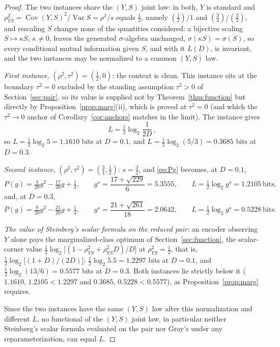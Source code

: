 ﻿\documentclass[11pt,onecolumn]{IEEEtran}
\newcommand{\Cov}{\operatorname{Cov}}
\begin{document}
\begin{proof}
The two instances share the $(Y,S)$ joint law: in both, $Y$ is standard
and
$\rho_{YS}^2=\Cov(Y,S)^2/\operatorname{Var}S=\rho^2/s$ equals
$\tfrac12$, namely $(\tfrac12)/1$ and $(\tfrac34)/(\tfrac32)$, and
rescaling $S$ changes none of the quantities considered: a bijective
scaling $S\mapsto\kappa S$, $\kappa\ne0$, leaves the generated
$\sigma$-algebra unchanged, $\sigma(\kappa S)=\sigma(S)$, so every
conditional mutual information given $S$, and with it $L(D)$, is
invariant, and the two instances may be normalized to a common
$(Y,S)$ law.

\emph{First instance,} $(\rho^2,\tau^2)=(\tfrac12,0)$: the context is
clean. This instance sits at the boundary $\tau^2=0$ excluded by the
standing assumption $\tau^2>0$ of Section~\ref{sec:pair}, so its value
is supplied not by Theorem~\ref{thm:function} but directly by
Proposition~\ref{prop:marg}(ii), which is proved at $\tau^2=0$ (and
which the $\tau^2\to0$ anchor of Corollary~\ref{cor:anchors} matches
in the limit). The instance gives
\[
L=\tfrac12\log_2\frac{1}{2D}\,,
\]
so $L=\tfrac12\log_2 5=1.1610$ bits
at $D=0.1$, and $L=\tfrac12\log_2(5/3)=0.3685$ bits at $D=0.3$.

\emph{Second instance,} $(\rho^2,\tau^2)=(\tfrac34,\tfrac12)$:
$s=\tfrac32$, and \eqref{eq:Pg} becomes, at $D=0.1$,
\[
P(g)=\tfrac{3}{20}g^2-\tfrac{17}{20}g+\tfrac14,
\qquad
g^\star=\frac{17+\sqrt{229}}{6}=5.3555,
\qquad
L=\tfrac12\log_2 g^\star=1.2105\ \text{bits},
\]
and, at $D=0.3$,
\[
P(g)=\tfrac{9}{20}g^2-\tfrac{21}{20}g+\tfrac14,
\qquad
g^\star=\frac{21+\sqrt{261}}{18}=2.0642,
\qquad
L=\tfrac12\log_2 g^\star=0.5228\ \text{bits}.
\]

\emph{The value of Steinberg's scalar formula on the reduced pair:} an
encoder observing $Y$
alone pays the marginalized-class optimum of
Section~\ref{sec:function}, the scalar-corner value
$\tfrac12\log_2\bigl[(1-\rho_{YS}^2+\rho_{YS}^2D)/D\bigr]$ at
$\rho_{YS}^2=\tfrac12$, that is,
$\tfrac12\log_2\bigl[(1+D)/(2D)\bigr]$: $\tfrac12\log_2 5.5=1.2297$
bits at $D=0.1$, and $\tfrac12\log_2(13/6)=0.5577$ bits at $D=0.3$.
Both instances lie strictly below it ($1.1610,\,1.2105<1.2297$ and
$0.3685,\,0.5228<0.5577$), as Proposition~\ref{prop:marg} requires.

Since the two instances have the same $(Y,S)$ law after this
normalization and different $L$, no functional of the $(Y,S)$ joint
law, in particular neither Steinberg's scalar formula evaluated on the
pair nor Gray's under any reparameterization, can equal $L$.
\end{proof}
\end{document}
